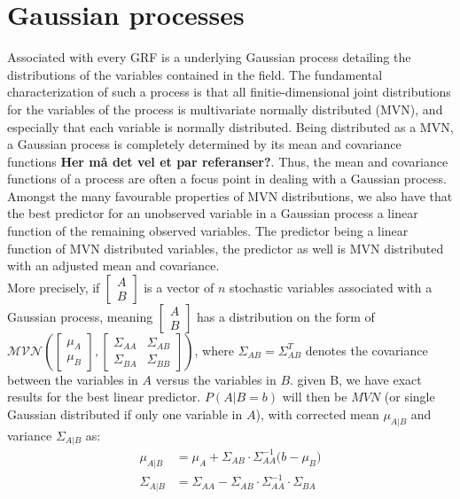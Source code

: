 \documentclass{report}
\begin{document}
\section{Gaussian processes} \label{sec:gaussian_processes}
Associated with every GRF is a underlying Gaussian process detailing the distributions of the variables contained in the field. The fundamental characterization of such a process is that all finitie-dimensional joint distributions for the variables of the process is multivariate normally distributed (MVN), and especially that each variable is normally distributed. Being distributed as a MVN, a Gaussian process is completely determined by its mean and covariance functions \textbf{Her må det vel et par referanser?}. Thus, the mean and covariance functions of a process are often a focus point in dealing with a Gaussian process. \\

Amongst the many favourable properties of MVN distributions, we also have that the best predictor for an unobserved variable in a Gaussian process a linear function of the remaining observed variables. The predictor being a linear function of MVN distributed variables, the predictor as well is MVN distributed with an adjusted mean and covariance. \\ 

\indent More precisely, if $\begin{bmatrix} A \\ B \end{bmatrix}$ is a vector of $n$ stochastic variables associated with a Gaussian process, meaning $\begin{bmatrix} A \\ B \end{bmatrix}$ has a distribution on the form of $\mathcal{MVN}(\begin{bmatrix} \mu_A \\ \mu_B \end{bmatrix}, \begin{bmatrix} \Sigma_{AA} & \Sigma_{AB} \\ \Sigma_{BA} & \Sigma_{BB} \end{bmatrix})$, where $\Sigma_{AB} = \Sigma_{AB}^T$ denotes the covariance between the variables in $A$ versus the variables in $B$.  given B, we have exact results for the best linear predictor. $P(A | B = b)$ will then be $MVN$ (or single Gaussian distributed if only one variable in $A$), with corrected mean $\mu_{A | B}$ and variance $\Sigma_{A | B}$ as:
\begin{align}
\mu_{A | B} &= \mu_A + \Sigma_{AB}\cdot \Sigma_{AA}^{-1}\big( b - \mu_B \big) \label{eq:gaussian_conditional_expectancy} \\
\Sigma_{A | B} &= \Sigma_{AA} - \Sigma_{AB} \cdot \Sigma_{AA}^{-1} \cdot \Sigma_{BA} \label{eq:gaussian_conditional_variance}
\end{align}
\end{document}

